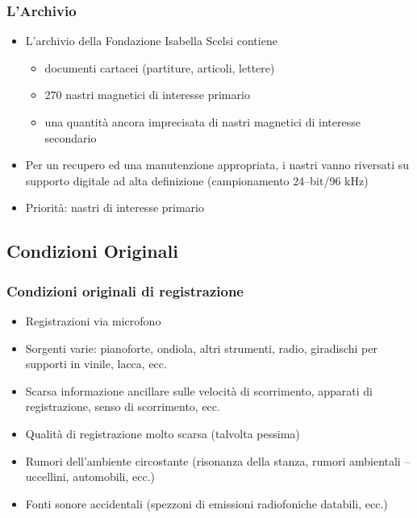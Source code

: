 \documentclass[compress,xcolor=dvipsnames]{beamer}
\newcommand{\FIS}{Fondazione Isabella Scelsi\xspace}
\begin{document}
\begin{frame}
	\frametitle{L'Archivio}

	\pause
	\begin{itemize}%

		\item L'archivio della \FIS contiene

			\begin{itemize}%

				\item documenti cartacei (partiture, articoli, lettere)

				\item 270 nastri magnetici di interesse primario

				\item una quantit\`a ancora imprecisata di nastri magnetici di
				      interesse secondario

			\end{itemize}

		\item Per un recupero ed una manutenzione appropriata, i nastri vanno
		      riversati su supporto digitale ad alta definizione
			  (campionamento 24--bit/96 kHz)

		\item Priorit\`a: nastri di interesse primario

	\end{itemize}

\end{frame}

\subsection{Condizioni Originali}
\begin{frame}
	\frametitle{Condizioni originali di registrazione}

	\begin{itemize}%

		\item Registrazioni via microfono

		\item Sorgenti varie: pianoforte, ondiola, altri strumenti, radio,
		      giradischi per supporti in vinile, lacca, ecc.

		\item Scarsa informazione ancillare sulle velocit\`a di scorrimento,
		      apparati di registrazione, senso di scorrimento, ecc.

		\item Qualit\`a di registrazione molto scarsa (talvolta pessima)

	    \item Rumori dell'ambiente circostante (risonanza della stanza, rumori
			  ambientali -- uccellini, automobili, ecc.)

		\item Fonti sonore accidentali (spezzoni di emissioni radiofoniche
		      databili, ecc.)

	\end{itemize}

\end{frame}
\end{document}
